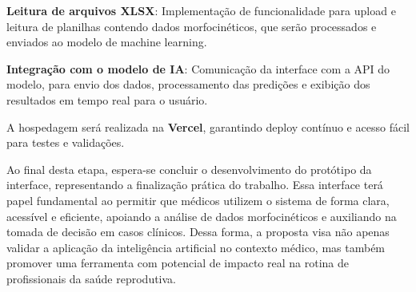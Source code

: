 \textbf{Leitura de arquivos XLSX}: Implementação de funcionalidade para upload e leitura de planilhas contendo dados morfocinéticos, que serão processados e enviados ao modelo de machine learning.

\textbf{Integração com o modelo de IA}: Comunicação da interface com a API do modelo, para envio dos dados, processamento das predições e exibição dos resultados em tempo real para o usuário.

A hospedagem será realizada na \textbf{Vercel}, garantindo deploy contínuo e acesso fácil para testes e validações.

Ao final desta etapa, espera-se concluir o desenvolvimento do protótipo da interface, representando a finalização prática do trabalho. Essa interface terá papel fundamental ao permitir que médicos utilizem o sistema de forma clara, acessível e eficiente, apoiando a análise de dados morfocinéticos e auxiliando na tomada de decisão em casos clínicos. Dessa forma, a proposta visa não apenas validar a aplicação da inteligência artificial no contexto médico, mas também promover uma ferramenta com potencial de impacto real na rotina de profissionais da saúde reprodutiva.